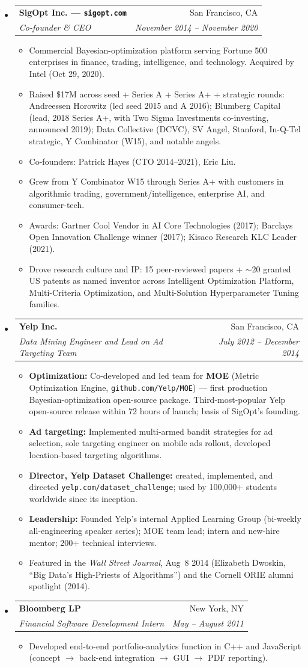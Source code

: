 \documentclass[letterpaper,11pt]{article}
\makeatletter
\newcommand{\resitem}[1]{\item #1 \vspace{-2pt}}
\newcommand{\ressubheading}[4]{
\begin{tabular*}{6.5in}{l@{\cftdotfill{\cftsecdotsep}\extracolsep{\fill}}r}
		\textbf{#1} & #2 \\
		\textit{#3} & \textit{#4} \\
\end{tabular*}\vspace{-6pt}}
\makeatother
\begin{document}
\begin{itemize}
\item
	\ressubheading{SigOpt Inc. --- \texttt{sigopt.com}}{San Francisco, CA}{Co-founder \& CEO}{November 2014 -- November 2020}
	\begin{itemize}
		\resitem{Commercial Bayesian-optimization platform serving Fortune 500 enterprises in finance, trading, intelligence, and technology. Acquired by Intel (Oct 29, 2020).}
		\resitem{Raised \$17M across seed + Series A + Series A+ + strategic rounds: Andreessen Horowitz (led seed 2015 and A 2016); Blumberg Capital (lead, 2018 Series A+, with Two Sigma Investments co-investing, announced 2019); Data Collective (DCVC), SV Angel, Stanford, In-Q-Tel strategic, Y Combinator (W15), and notable angels.}
		\resitem{Co-founders: Patrick Hayes (CTO 2014--2021), Eric Liu.}
		\resitem{Grew from Y Combinator W15 through Series A+ with customers in algorithmic trading, government/intelligence, enterprise AI, and consumer-tech.}
		\resitem{Awards: Gartner Cool Vendor in AI Core Technologies (2017); Barclays Open Innovation Challenge winner (2017); Kisaco Research KLC Leader (2021).}
		\resitem{Drove research culture and IP: 15 peer-reviewed papers + $\sim$20 granted US patents as named inventor across Intelligent Optimization Platform, Multi-Criteria Optimization, and Multi-Solution Hyperparameter Tuning families.}
	\end{itemize}

\item
	\ressubheading{Yelp Inc.}{San Francisco, CA}{Data Mining Engineer and Lead on Ad Targeting Team}{July 2012 -- December 2014}
	\begin{itemize}
		\resitem{\textbf{Optimization:} Co-developed and led team for \textbf{MOE} (Metric Optimization Engine, \texttt{github.com/Yelp/MOE}) --- first production Bayesian-optimization open-source package. Third-most-popular Yelp open-source release within 72 hours of launch; basis of SigOpt's founding.}
		\resitem{\textbf{Ad targeting:} Implemented multi-armed bandit strategies for ad selection, sole targeting engineer on mobile ads rollout, developed location-based targeting algorithms.}
		\resitem{\textbf{Director, Yelp Dataset Challenge:} created, implemented, and directed \texttt{yelp.com/dataset\_challenge}; used by 100{,}000+ students worldwide since its inception.}
		\resitem{\textbf{Leadership:} Founded Yelp's internal Applied Learning Group (bi-weekly all-engineering speaker series); MOE team lead; intern and new-hire mentor; 200+ technical interviews.}
		\resitem{Featured in the \textit{Wall Street Journal}, Aug~8 2014 (Elizabeth Dwoskin, ``Big Data's High-Priests of Algorithms'') and the Cornell ORIE alumni spotlight (2014).}
	\end{itemize}

\item
	\ressubheading{Bloomberg LP}{New York, NY}{Financial Software Development Intern}{May -- August 2011}
	\begin{itemize}
		\resitem{Developed end-to-end portfolio-analytics function in C++ and JavaScript (concept $\to$ back-end integration $\to$ GUI $\to$ PDF reporting).}
	\end{itemize}

\end{itemize}
\end{document}
